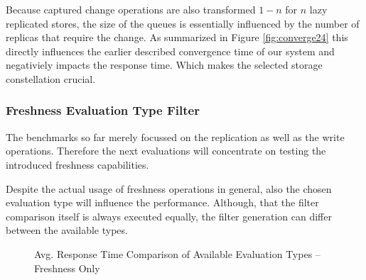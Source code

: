 Because captured change operations are also transformed $1-n$ for $n$ lazy replicated stores, the size of the queues is essentially influenced by the number of replicas that
require the change. 
As summarized in Figure \ref{fig:converge24} this directly influences the earlier described convergence time of our system and negativiely impacts the response time.
Which makes the selected storage constellation crucial.









\subsubsection{Freshness Evaluation Type Filter} 

The benchmarks so far merely focussed on the replication as well as the write operations.
Therefore the next evaluations will concentrate on testing the introduced freshness capabilities.

Despite the actual usage of freshness operations in general, also the chosen evaluation type will influence the performance.
Although, that the filter comparison itself is always executed equally, the filter generation can differ between the available types.

\begin{figure}[t] 
    \centering 
    \caption{Avg. Response Time Comparison of Available Evaluation Types -- Freshness Only}
    \label{fig:eval_type}
\end{figure}


